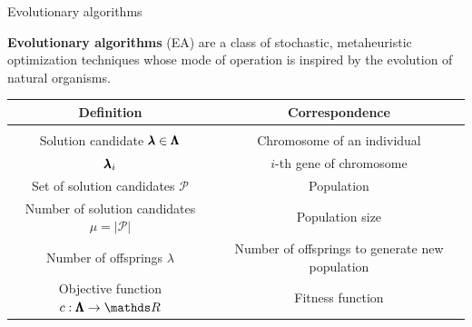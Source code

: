 
\subtitle{Evolutionary Algorithms}




\maketitle



\begin{frame}[containsverbatim]{Evolutionary algorithms}

\textbf{Evolutionary algorithms} (EA) are a class of stochastic, metaheuristic optimization techniques whose mode of operation is inspired by the evolution of natural organisms.

\vspace{0.5cm}

\begin{center}
\begin{tabular}{ c | c }
\textbf{Definition} & \textbf{Correspondence} \\[0.05cm]
\hline \\[0.01cm]
Solution candidate $\pmb{\lambda} \in \pmb{\Lambda}$ & Chromosome of an individual \\[0.1cm]
$\pmb{\lambda}_{i}$& $i$-th gene of chromosome\\[0.1cm]
Set of solution candidates $\mathcal{P}$ & Population \\[0.1cm]
Number of solution candidates $\mu = |\mathcal{P}|$ & Population size \\[0.1cm]
Number of offsprings $\lambda$ & Number of offsprings to generate new population\\[0.1cm]
Objective function $\f: \XX \to \R$ & Fitness function
\end{tabular}
\end{center}
\end{frame}

